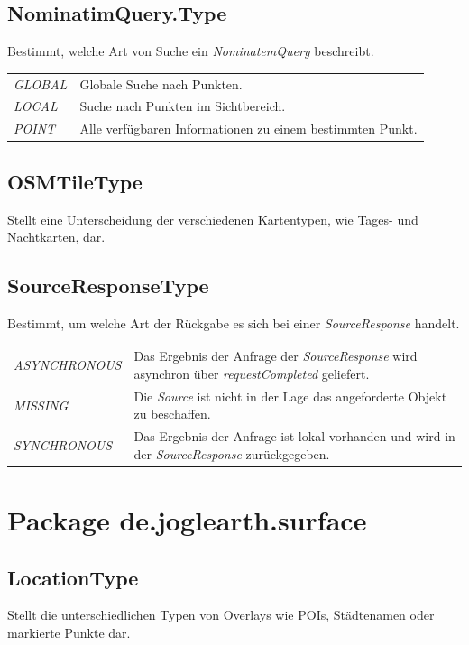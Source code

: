 \documentclass[10pt]{scrreprt}
\begin{document}
\subsection*{NominatimQuery.Type}
Bestimmt, welche Art von Suche ein \textit{NominatemQuery} beschreibt.\\[3mm]
\begin{tabular}{p{4cm} p{11cm}}
\textit{GLOBAL} & Globale Suche nach Punkten. \\
\textit{LOCAL} & Suche nach Punkten im Sichtbereich. \\
\textit{POINT} & Alle verfügbaren Informationen zu einem bestimmten Punkt. \\
\end{tabular}

\vspace{5mm}
\subsection*{OSMTileType}
Stellt eine Unterscheidung der verschiedenen Kartentypen, wie Tages- und Nachtkarten, dar.

\vspace{5mm}
\subsection*{SourceResponseType}
Bestimmt, um welche Art der Rückgabe es sich bei einer \textit{SourceResponse} handelt.\\[3mm]
\begin{tabular}{p{4cm} p{11cm}}
\textit{ASYNCHRONOUS} & Das Ergebnis der Anfrage der \textit{SourceResponse} wird asynchron über \textit{requestCompleted} geliefert.\\
\textit{MISSING} & Die \textit{Source} ist nicht in der Lage das angeforderte Objekt zu beschaffen.\\
\textit{SYNCHRONOUS} & Das Ergebnis der Anfrage ist lokal vorhanden und wird in der \textit{SourceResponse} zurückgegeben.\\
\end{tabular}


\vspace{5mm}
\section*{Package de.joglearth.surface}
\subsection*{LocationType}
Stellt die unterschiedlichen Typen von Overlays wie POIs, Städtenamen oder markierte Punkte dar.
\end{document}
